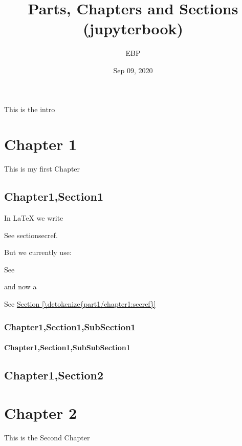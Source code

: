\documentclass[letterpaper,10pt,english]{sphinxmanual}
\title{Parts, Chapters and Sections (jupyterbook)}
\date{Sep 09, 2020}
\author{EBP}
\begin{document}
\pagestyle{empty}
\sphinxmaketitle
\pagestyle{plain}
\sphinxtableofcontents
\pagestyle{normal}
\label{\detokenize{intro::doc}}


This is the intro


\chapter{Chapter 1}
\label{\detokenize{part1/chapter1:chapter-1}}\label{\detokenize{part1/chapter1::doc}}
This is my first Chapter


\section{Chapter1,Section1}
\label{\detokenize{part1/chapter1:chapter1-section1}}\label{\detokenize{part1/chapter1:secref}}
In LaTeX we write

\begin{sphinxVerbatim}[commandchars=\\\{\}]
See section\PYGZti{}secref.
\end{sphinxVerbatim}

But we currently use:

See {\hyperref[\detokenize{part1/chapter1:secref}]{}}

and now a 

See \hyperref[\detokenize{part1/chapter1:secref}]{Section \ref{\detokenize{part1/chapter1:secref}}}


\subsection{Chapter1,Section1,SubSection1}
\label{\detokenize{part1/chapter1:chapter1-section1-subsection1}}

\subsubsection{Chapter1,Section1,SubSubSection1}
\label{\detokenize{part1/chapter1:chapter1-section1-subsubsection1}}

\section{Chapter1,Section2}
\label{\detokenize{part1/chapter1:chapter1-section2}}

\chapter{Chapter 2}
\label{\detokenize{part1/chapter2:chapter-2}}\label{\detokenize{part1/chapter2::doc}}
This is the Second Chapter
\end{document}
